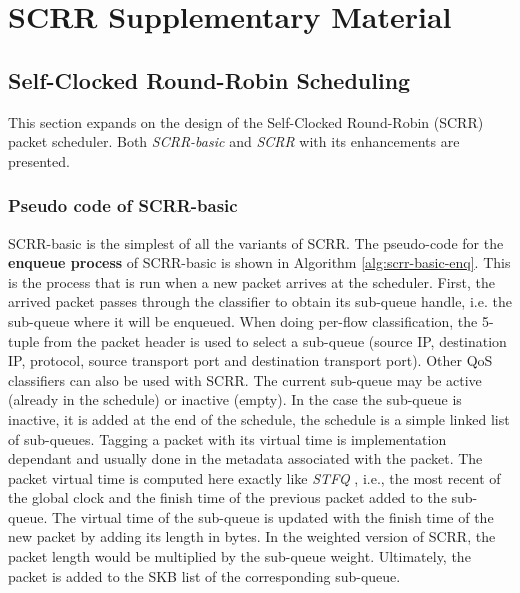 \chapter{SCRR Supplementary Material} \label{chap:appendix-scrr}


\section{Self-Clocked Round-Robin Scheduling}
\label{app:algs}




This section expands on the design of the Self-Clocked
Round-Robin (SCRR) packet scheduler. Both \textit{SCRR-basic} and
\textit{SCRR} with its enhancements are presented.

\subsection{Pseudo code of SCRR-basic}
\label{app:algs-basic}

SCRR-basic is the simplest of all the variants of SCRR.
The pseudo-code for the \textbf{enqueue process} of SCRR-basic is
shown in Algorithm \ref{alg:scrr-basic-enq}. This is the process that
is run when a new packet arrives at the scheduler. First, the arrived
packet passes through the classifier to obtain its sub-queue handle,
i.e. the sub-queue where it will be enqueued. When doing per-flow
classification, the 5-tuple from the packet header is used to select
a sub-queue (source IP, destination IP, protocol, source transport
port and destination transport port). Other QoS classifiers can also be used
with SCRR. The current sub-queue may be active (already in the
schedule) or inactive (empty). In the case the sub-queue is inactive,
it is added at the end of the schedule, the schedule is a simple
linked list of sub-queues. Tagging a packet with its virtual time is implementation dependant and usually done in the metadata associated with the packet. The packet virtual time is computed here
exactly like \textit{STFQ} \cite{stfq}, i.e., the most recent of the
global clock and the finish time of the previous packet added to the
sub-queue. The virtual time of the sub-queue is updated with the
finish time of the new packet by adding its length in bytes. In the
weighted version of SCRR, the packet length would be multiplied by the
sub-queue weight. Ultimately, the packet is added to the SKB list of
the corresponding sub-queue.

